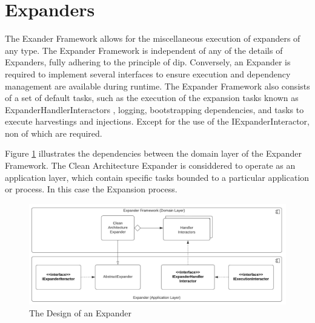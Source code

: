 \section{Expanders}

The Exander Framework allows for the miscellaneous execution of expanders of any type. The
Expander Framework is independent of any of the details of Expanders, fully adhering to
the principle of \gls{dip}. Conversely, an Expander is required to implement several
interfaces to ensure execution and dependency management are available during runtime. The
Expander Framework also consists of a set of default tasks, such as the execution of the
expansion tasks known as ExpanderHandlerInteractors
, logging, bootstrapping dependencies, and
tasks to execute harvestings and injections. Except for the use of the
IExpanderInteractor, non of which are required.

Figure \ref{fig_expander_design} illustrates the dependencies between the domain layer of
the Expander Framework. The Clean Architecture Expander is considdered to operate as an
application layer, which contain specific tasks bounded to a particular application or
process. In this case the Expansion process.

\begin{figure}[H]
    \centering
    \includegraphics[width=1\textwidth]{figures/expander.pdf}
    \caption[The Design of an Expander]{The Design of an Expander}
    \label{fig_expander_design}
  \end{figure}